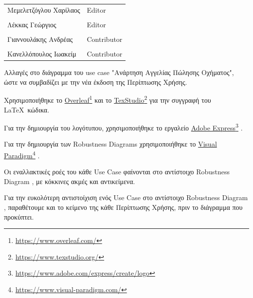 \documentclass{../ol-softwaremanual}
\newcommand{\doclink}[2]{\href{#1}{#2}\footnote{\url{#1}}}
\begin{document}
	
	\vspace{20pt}
	
	\begin{table}[htbp!]
		\begin{tabular}{ll}
			Μεμελετζόγλου Χαρίλαος & \en Editor \\
			\\ Λέκκας Γεώργιος      &   \en  Editor \\
			\\ Γιαννουλάκης Ανδρέας & \en Contributor \\
			\\ Κανελλόπουλος Ιωακείμ & \en Contributor \\ 
		\end{tabular}
	\end{table}
	
	
	\flushleft
	
	Αλλαγές στο διάγραμμα του \en use case "\gr Ανάρτηση Αγγελίας Πώλησης Οχήματος\en"\gr, ώστε να συμβαδίζει με την νέα έκδοση της Περίπτωσης Χρήσης.
	
	
	\newpage
	
	
	\vspace{20pt}
	\flushleft
	Χρησιμοποιήθηκε το \en \doclink{https://www.overleaf.com/}{Overleaf} \gr και το \en \doclink{https://www.texstudio.org/}{TexStudio} \gr για την συγγραφή του \LaTeX\ κώδικα. \break
	
	Για την δημιουργία του λογότυπου, χρησιμοποιήθηκε το εργαλείο \en \doclink{https://www.adobe.com/express/create/logo}{Adobe Express} . \gr \break
	
	Για την δημιουργία των \en Robustness Diagrams \gr χρησιμοποιήθηκε το \en \doclink{https://www.visual-paradigm.com/}{Visual Paradigm} . \gr \break 
	
	\newpage
	
	\flushleft
	
	Οι εναλλακτικές ροές του κάθε \en Use Case \gr φαίνονται στο αντίστοιχο \en Robustness Diagram \gr, με κόκκινες ακμές και αντικείμενα. \break
	
	Για την ευκολότερη αντιστοίχιση ενός \en Use Case \gr στο αντίστοιχο \en Robustness Diagram \gr, παραθέτουμε και το κείμενο της κάθε Περίπτωσης Χρήσης, πριν το διάγραμμα που προκύπτει. \break
	
\end{document}
